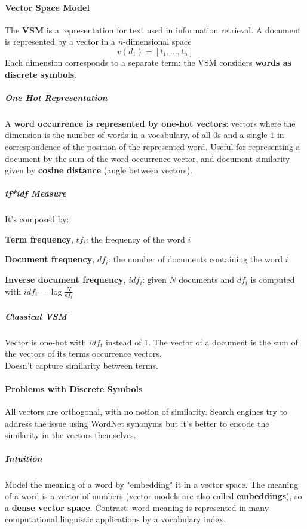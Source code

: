 \documentclass[10pt]{report}
\begin{document}
\paragraph{Vector Space Model} The \textbf{VSM} is a representation for text used in information retrieval. A document is represented by a vector in a $n$-dimensional space $$v(d_1) = [t_1,\ldots, t_n]$$
Each dimension corresponds to a separate term: the VSM considers \textbf{words as discrete symbols}.
\subparagraph{One Hot Representation} A \textbf{word occurrence is represented by one-hot vectors}: vectors where the dimension is the number of words in a vocabulary, of all $0$s and a single $1$ in correspondence of the position of the represented word. Useful for representing a document by the sum of the word occurrence vector, and document similarity given by \textbf{cosine distance} (angle between vectors).
\subparagraph{tf*idf Measure} It's composed by:
\begin{list}{}{}
	\item \textbf{Term frequency}, $tf_i$: the frequency of the word $i$
	\item \textbf{Document frequency}, $df_i$: the number of documents containing the word $i$
	\item \textbf{Inverse document frequency}, $idf_i$: given $N$ documents and $df_i$ is computed with $idf_i=\log\frac{N}{df_i}$
\end{list}
\subparagraph{Classical VSM} Vector is one-hot with $idf_t$ instead of $1$. The vector of a document is the sum of the vectors of its terms occurrence vectors.\\
Doesn't capture similarity between terms.
\paragraph{Problems with Discrete Symbols} All vectors are orthogonal, with no notion of similarity. Search engines try to address the issue using WordNet synonyms but it's better to encode the similarity in the vectors themselves.
\subparagraph{Intuition} Model the meaning of a word by "embedding" it in a vector space. The meaning of a word is a vector of numbers (vector models are also called \textbf{embeddings}), so a \textbf{dense vector space}. Contrast: word meaning is represented in many computational linguistic applications by a vocabulary index.
\end{document}
